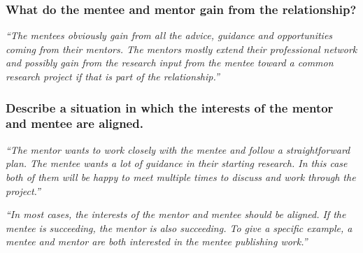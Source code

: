 \documentclass[12pt]{beamer}
\newcommand\ans[1]{{\it ``#1''}}
\newcommand\gap{\vspace{5mm}}
\begin{document}
\begin{frame} %

\frametitle{What do the mentee and mentor gain from the relationship?}

\ans{The mentees obviously gain from all the advice,  guidance and opportunities coming from their mentors. The mentors mostly extend their professional network and possibly gain from the research input from the mentee toward a common research project if that is part of the relationship.}





\end{frame}

\begin{frame} %
\frametitle{ Describe a situation in which the interests of the mentor and mentee are aligned.}

\ans{The mentor wants to work closely with the mentee and follow a straightforward plan.  The mentee wants a lot of guidance in their starting research.  In this case both of them will be happy to meet multiple times to discuss and work through the project.}

\gap

\ans{In most cases, the interests of the mentor and mentee should be aligned.  If the mentee is succeeding, the mentor is also succeeding.  To give a specific example, a mentee and mentor are both interested in the mentee publishing work.}
  
\end{frame}
\end{document}
